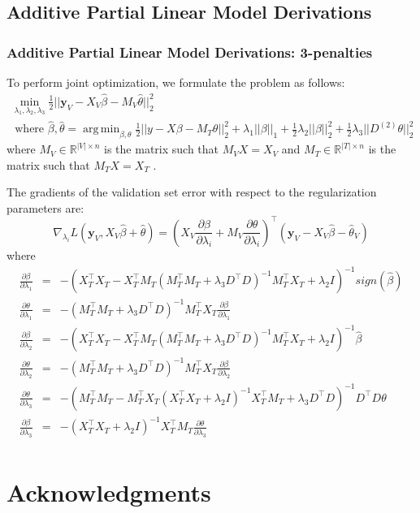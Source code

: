 \documentclass[10pt,letterpaper]{article}
\DeclareMathOperator*{\argmin}{arg\,min}
\begin{document}
\subsection{Additive Partial Linear Model Derivations}

\subsubsection{Additive Partial Linear Model Derivations: 3-penalties}

To perform joint optimization, we formulate the problem as follows:
\begin{multline}
\min_{\lambda_1, \lambda_2, \lambda_3} \frac{1}{2} \bigl\lvert\bigl\lvert \boldsymbol y_V - X_V\hat\beta - M_V \hat\theta \bigl\rvert\bigl\rvert^2_2 \\
\text{ where } \hat\beta, \hat\theta = \argmin_{\beta, \theta} \frac{1}{2} \bigl\lvert\bigl\lvert y - X\beta - M_T \theta \bigl\rvert\bigl\rvert^2_2
+ \lambda_1 \lvert\lvert \beta \rvert \rvert_1
+ \frac{1}{2} \lambda_2 \lvert\lvert \beta \rvert \rvert_2^2
+ \frac{1}{2} \lambda_3 \lvert\lvert D^{(2)} \theta \rvert \rvert_2^2
\end{multline}
where $M_V \in \mathbb{R}^{|V| \times n}$ is the matrix such that $M_V X = X_V$ and $M_T \in \mathbb{R}^{|T| \times n}$ is the matrix such that $M_T X = X_T$ .

The gradients of the validation set error with respect to the regularization parameters are:
\begin{equation}
\nabla_{\lambda_i} L(\boldsymbol y_V, X_V \hat \beta + \hat \theta) = (X_V \frac{\partial \beta}{\partial \lambda_i} + M_V \frac{\partial \theta}{\partial \lambda_i})^\top(\boldsymbol y_V - X_V \hat \beta - \hat \theta_V)
\end{equation}
where
\begin{equation}
\begin{array}{lcl}
\frac{\partial \beta}{\partial \lambda_1} &=& -(X_T^\top X_T - X_T^\top M_T(M_T^\top M_T + \lambda_3 D^\top D)^{-1} M_T^\top X_T + \lambda_2 I)^{-1} sign(\hat \beta) \\
\frac{\partial \theta}{\partial \lambda_1} &=& -(M_T^\top M_T + \lambda_3 D^\top D)^{-1}  M_T^\top X_T \frac{\partial \beta}{\partial \lambda_1}
\\
\frac{\partial \beta}{\partial \lambda_2} &=& -(X_T^\top X_T - X_T^\top M_T(M_T^\top M_T + \lambda_3 D^\top D)^{-1} M_T^\top X_T + \lambda_2 I)^{-1} \hat \beta \\
\frac{\partial \theta}{\partial \lambda_2} &=& -(M_T^\top M_T + \lambda_3 D^\top D)^{-1}  M_T^\top X_T \frac{\partial \beta}{\partial \lambda_2}
\\
\frac{\partial \theta}{\partial \lambda_3} &=& -(M_T^\top M_T - M_T^\top X_T (X_T^\top X_T + \lambda_2 I)^{-1} X_T^\top M_T + \lambda_3 D^\top D)^{-1} D^\top D \theta
\\
\frac{\partial \beta}{\partial \lambda_3} &=& - (X_T^\top X_T + \lambda_2 I)^{-1} X_T^\top M_T \frac{\partial \theta}{\partial \lambda_3} \\
\end{array}
\end{equation}

\section*{Acknowledgments}




\end{document}
